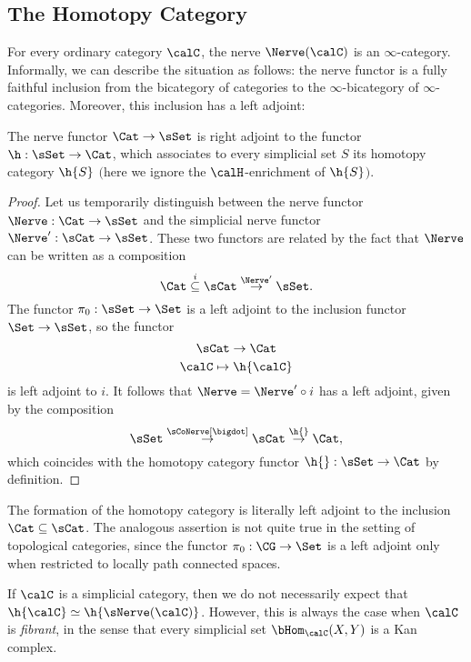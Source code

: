 \subsection{The Homotopy Category}\label{hcat}

For every ordinary category $\calC$, the nerve $\Nerve(\calC)$ is an $\infty$-category. 
Informally, we can describe the situation as follows: the nerve functor is a fully faithful inclusion from the bicategory of categories to the $\infty$-bicategory of $\infty$-categories.
Moreover, this inclusion has a left adjoint:

\begin{proposition}\label{leftadj}
The nerve functor $\Cat \rightarrow \sSet$ is right adjoint to the functor
$\h: \sSet \rightarrow \Cat$, which associates to every simplicial set $S$ its
homotopy category $\h{S}$ $($here we ignore the $\calH$-enrichment of $\h{S}${}$)$.
\end{proposition}

\begin{proof}
Let us temporarily distinguish between the nerve functor $\Nerve: \Cat \rightarrow \sSet$
and the simplicial nerve functor $\Nerve': \sCat \rightarrow \sSet$. These two functors are related by the fact that $\Nerve$ can be written as a composition
$$ \Cat \stackrel{i}{\subseteq} \sCat \stackrel{\Nerve'}{\rightarrow} \sSet.$$
The functor $\pi_0: \sSet \rightarrow \Set$ is a left adjoint to the inclusion functor
$\Set \rightarrow \sSet$, so the functor
$$ \sCat \rightarrow \Cat$$
$$ \calC \mapsto \h{\calC}$$
is left adjoint to $i$. It follows that $\Nerve = \Nerve' \circ i$ has a left adjoint, given by the composition
$$ \sSet \stackrel{ \sCoNerve[ \bigdot] }{\rightarrow} \sCat \stackrel{ \h{}}{\rightarrow} \Cat,$$
which coincides with the homotopy category functor $\h{}: \sSet \rightarrow \Cat$ by definition.
\end{proof}

\begin{remark}
The formation of the homotopy category is literally left adjoint to
the inclusion $\Cat \subseteq \sCat$. The analogous assertion is not
quite true in the setting of topological categories, since the
functor $\pi_0: \CG \rightarrow \Set$ is a left adjoint only when
restricted to locally path connected spaces.
\end{remark}

\begin{warning}
If $\calC$ is a simplicial category, then we do not necessarily
expect that $\h{\calC} \simeq \h{\sNerve(\calC)}$. However, this is always
the case when $\calC$ is {\it fibrant}, in the sense that every
simplicial set $\bHom_{\calC}(X,Y)$ is a Kan complex.
\end{warning}

